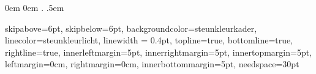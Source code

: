 \newenvironment{Uitbreiding}{\begin{xmuitweiding}}{\end{xmuitweiding}}
    {0em} %
    {0em} %
    {\itshape} %
    {} %
    {\bfseries} %
    {.} %
    {.5em} %
    {} %
\theoremstyle{mystyle}
\newtheorem{oefening}[lemma]{Oefening}
\newtheorem{definitie}[lemma]{Definitie} 
\newtheorem{voorbeeld}[lemma]{Voorbeeld}
\newtheorem{eigenschap}[lemma]{Eigenschap} 
\newtheorem{stelling}[lemma]{Stelling} 
\newtheorem{gevolg}[lemma]{Gevolg} 
\newtheorem{afspraak}[lemma]{Afspraak} 
\newtheorem{werkwijze}[lemma]{Werkwijze}

\makeatletter
\renewenvironment{proof}[1][\proofname]{\par
  \vspace{-\topsep}%
  \pushQED{\qed}%
  \normalfont
  \topsep0pt \partopsep0pt %
  \trivlist
  \item[\hskip\labelsep
        \itshape
    #1\@addpunct{.}]\ignorespaces
}{%
  \popQED\endtrivlist\@endpefalse
  \addvspace{0pt plus 0pt} %
}
\makeatother


{skipabove=6pt, 
skipbelow=6pt, 
backgroundcolor=steunkleurkader,
linecolor=steunkleurlicht,
linewidth = 0.4pt, 
topline=true,
bottomline=true, 
rightline=true,
innerleftmargin=5pt,
innerrightmargin=5pt,
innertopmargin=5pt,
leftmargin=0cm,
rightmargin=0cm,
innerbottommargin=5pt,
needspace=30pt %
}


